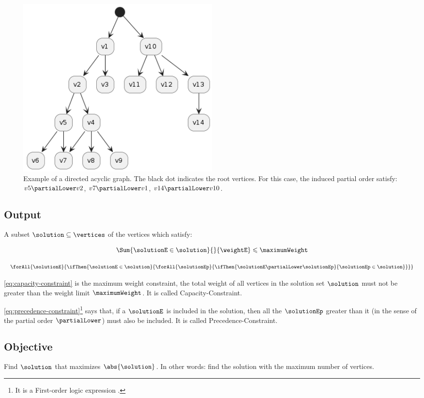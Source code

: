 \begin{figure}[ht!]
    \centering
    \includegraphics[width=0.5\textwidth]{images/directed acyclic graph.png}
    \caption{Example of a directed acyclic graph. The black dot indicates the root vertices. For this case, the induced partial order satisfy: $v5 \partialLower v2$, $v7 \partialLower v1$, $v14 \partialLower v10$.}
\end{figure}

\subsection{Output}

A subset $\solution \subseteq \vertices$ of the vertices which satisfy:

\begin{equation}
    \label{eq:capacity-constraint}
    \Sum
        {\solutionE \in \solution}
        {}
        {\weightE}
    \leqslant
    \maximumWeight
\end{equation}

\begin{equation}
    \label{eq:precedence-constraint}
    \forAll
        {\solutionE}
        {\ifThen
            {\solutionE \in \solution}
            {\forAll
                {\solutionEp}
                {\ifThen
                    {\solutionE \partialLower \solutionEp}
                    {\solutionEp \in \solution}
                }
            }
        }
\end{equation}

\eqref{eq:capacity-constraint} is the maximum weight constraint, the total weight of all vertices in the solution set $\solution$ must not be greater than the weight limit $\maximumWeight$. It is called Capacity-Constraint.

\eqref{eq:precedence-constraint}\footnote{It is a First-order logic expression \cite{bib:logic}.} says that, if a $\solutionE$ is included in the solution, then all the $\solutionEp$ greater than it (in the sense of the partial order $\partialLower$) must also be included. It is called Precedence-Constraint.

\subsection{Objective}

Find $\solution$ that maximizes $\abs{\solution}$. In other words: find the solution with the maximum number of vertices.
